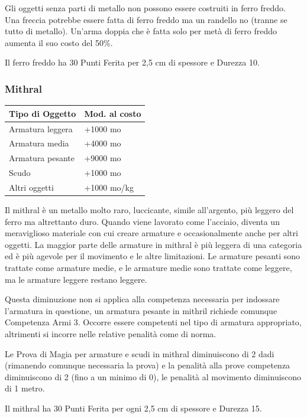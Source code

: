 \begin{multicols}{2}
Gli oggetti senza parti di metallo non possono essere costruiti in ferro freddo. Una freccia potrebbe essere fatta di ferro freddo ma un randello no (tranne se tutto di metallo). Un'arma doppia che è fatta solo per metà di ferro freddo aumenta il suo costo del 50\%.

Il ferro freddo ha 30 Punti Ferita per 2,5 cm di spessore e Durezza 10.

\subsubsection{Mithral}

\label{mithral}

\begin{tabularx}{0.48\textwidth}{Xl}
\textbf{Tipo di Oggetto} & \textbf{Mod. al costo}\\
\toprule
Armatura leggera & +1000 mo\\
Armatura media & +4000 mo\\
Armatura pesante & +9000 mo\\
Scudo & +1000 mo\\
Altri oggetti & +1000 mo/kg
\end{tabularx}

\medskip

Il mithral è un metallo molto raro, luccicante, simile all'argento, più leggero del ferro ma altrettanto duro. Quando viene lavorato come l'acciaio, diventa un meraviglioso materiale con cui creare armature e occasionalmente anche per altri oggetti. La maggior parte delle armature in mithral è più leggera di una categoria ed è più agevole per il movimento e le altre limitazioni. Le armature pesanti sono trattate come armature medie, e le armature medie sono trattate come leggere, ma le armature leggere restano leggere.

Questa diminuzione non si applica alla competenza necessaria per indossare l'armatura in questione, un armatura pesante in mithril richiede comunque Competenza Armi 3. Occorre essere competenti nel tipo di armatura appropriato, altrimenti si incorre nelle relative penalità come di norma.

Le Prova di Magia per armature e scudi in mithral diminuiscono di 2 dadi (rimanendo comunque necessaria la prova) e la penalità alla prove competenza diminuiscono di 2 (fino a un minimo di 0), le penalità al movimento diminuiscono di 1 metro.

Il mithral ha 30 Punti Ferita per ogni 2,5 cm di spessore e Durezza 15.


\end{multicols}
